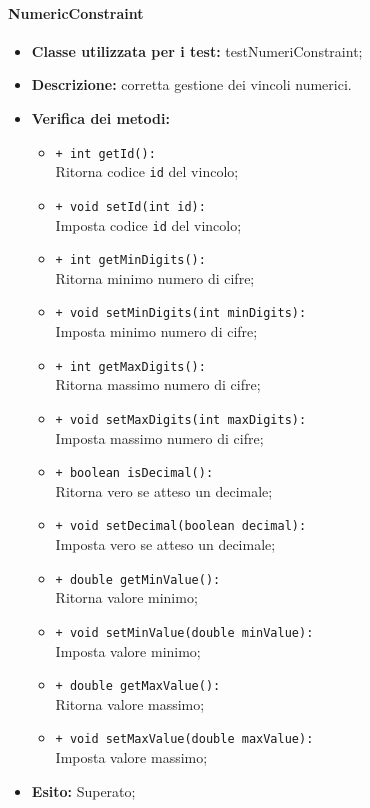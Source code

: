 \paragraph{NumericConstraint}
\begin{flushleft}
\begin{itemize}
\item \textbf{Classe utilizzata per i test:} testNumeriConstraint;
\item \textbf{Descrizione:} corretta gestione dei vincoli numerici.
\item \textbf{Verifica dei metodi:}
\begin{sloppypar}
\begin{itemize}
\item \texttt{+ int getId():}\\ Ritorna codice \texttt{id} del vincolo;
\item \texttt{+ void setId(int id):}\\ Imposta codice \texttt{id} del vincolo;
\item \texttt{+ int getMinDigits():}\\ Ritorna minimo numero di cifre;
\item \texttt{+ void setMinDigits(int minDigits):}\\ Imposta minimo numero di cifre;
\item \texttt{+ int getMaxDigits():}\\ Ritorna massimo numero di cifre;
\item \texttt{+ void setMaxDigits(int maxDigits):}\\ Imposta massimo numero di cifre;
\item \texttt{+ boolean isDecimal():}\\ Ritorna vero se atteso un decimale;
\item \texttt{+ void setDecimal(boolean decimal):}\\ Imposta vero se atteso un decimale;
\item \texttt{+ double getMinValue():}\\ Ritorna valore minimo;
\item \texttt{+ void setMinValue(double minValue):}\\ Imposta valore minimo;
\item \texttt{+ double getMaxValue():}\\ Ritorna valore massimo;
\item \texttt{+ void setMaxValue(double maxValue):}\\ Imposta valore massimo;
\end{itemize}
\end{sloppypar}
\item \textbf{Esito:} Superato;
\end{itemize}
\end{flushleft}

